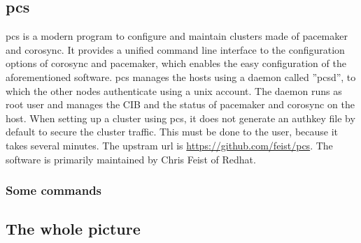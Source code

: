 \subsection{pcs}
\ac{pcs} is a modern program to configure and maintain clusters made of pacemaker and corosync. It provides a unified command line interface to the configuration options of corosync and pacemaker, which enables the easy configuration of the aforementioned software. pcs manages
the hosts using a daemon called ''pcsd'', to which the other nodes authenticate using a unix account.
The daemon runs as root user and manages the \ac{CIB} and the status of pacemaker and corosync on the host.
When setting up a cluster using pcs, it does not generate an authkey file by default to secure the
cluster traffic. This must be done to the user, because it takes several minutes.
The upstram url is \url{https://github.com/feist/pcs}. The software is primarily maintained by Chris Feist of Redhat.
\subsubsection{Some commands}

\subsection{The whole picture}
